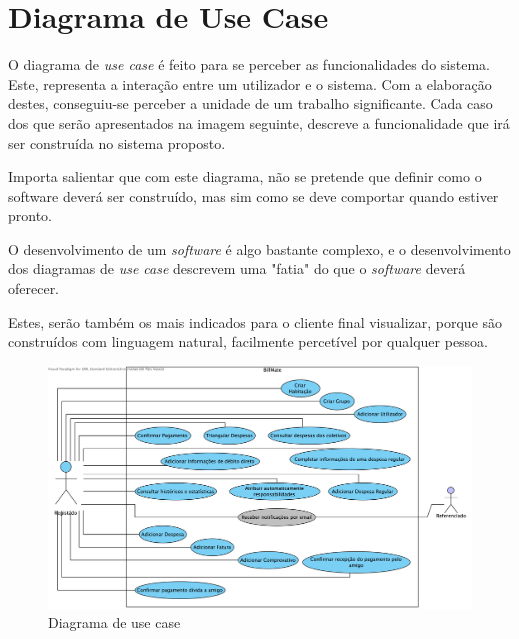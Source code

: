 \section{Diagrama de Use Case}

O diagrama de \textit{use case} é feito para se perceber as funcionalidades do sistema. Este, representa a interação entre um utilizador e o sistema. Com a elaboração destes, conseguiu-se perceber a unidade de um trabalho significante. Cada caso dos que serão apresentados na imagem seguinte, descreve a funcionalidade que irá ser construída no sistema proposto.

Importa salientar que com este diagrama, não se pretende que definir como o software deverá ser construído, mas sim como se deve comportar quando estiver pronto.

O desenvolvimento de um \textit{software} é algo bastante complexo, e o desenvolvimento dos diagramas de \textit{use case} descrevem uma "fatia" do que o \textit{software} deverá oferecer.

Estes, serão também os mais indicados para o cliente final visualizar, porque são construídos com linguagem natural, facilmente percetível por qualquer pessoa. \\


\begin{figure}[H]
\centerline{\includegraphics[width=1\textwidth]{images/modeling/useCase}}
\caption{Diagrama de use case}
\end{figure}
